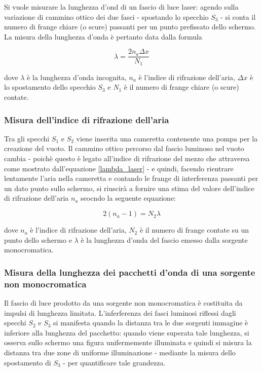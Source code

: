 \documentclass[]{article}
\begin{document}
Si vuole misurare la lunghezza d'ond di un fascio di luce laser: agendo sulla variazione di cammino ottico dei due fasci - spostando lo specchio $S_3$ - si conta il numero di frange chiare (o scure) passanti per un punto prefissato dello schermo. La misura della lunghezza d'onda è pertanto data dalla formula

\begin{equation}
    \label{lambda_laser}
    \lambda = \frac{2 n_a \Delta x}{N_1}
\end{equation}

dove $\lambda$ è la lunghezza d'onda incognita, $n_a$ è l'indice di rifrazione dell'aria, $\Delta x$ è lo spostamento dello specchio $S_3$ e $N_1$ è il numero di frange chiare (o scure) contate.

\subsubsection{Misura dell'indice di rifrazione dell'aria}

Tra gli specchi $S_1$ e $S_2$ viene inserita una cameretta contenente una pompa per la creazione del vuoto. Il cammino ottico percorso dal fascio luminoso nel vuoto cambia - poichè questo è legato all'indice di rifrazione del mezzo che attraversa come mostrato dall'equazione \ref{lambda_laser} - e quindi, facendo rientrare lentamente l'aria nella cameretta e contando le frange di interferenza passanti per un dato punto sullo schermo, si riuscirà a fornire una stima del valore dell'indice di rifrazione dell'aria $n_a$ seocndo la seguente equazione:

\begin{equation}
    \label{n_a}
    2(n_a - 1) = N_2 \lambda
\end{equation}

dove $n_a$ è l'indice di rifrazione dell'aria, $N_2$ è il numero di frange contate su un punto dello schermo e $\lambda$ è la lunghezza d'onda del fascio emesso dalla sorgente monocromatica.

\subsubsection{Misura della lunghezza dei pacchetti d'onda di una sorgente non monocromatica}

Il fascio di luce prodotto da una sorgente non monocromatica è costituita da impulsi di lunghezza limitata. L'inferferenza dei fasci luminosi riflessi dagli specchi $S_2$ e $S_3$ si manifesta quando la distanza tra le due sorgenti immagine è inferiore alla lunghezza del pacchetto: quando viene superata tale lunghezza, si osserva sullo schermo una figura unifermemente illuminata e quindi si misura la distanza tra due zone di uniforme illuminazione - mediante la misura dello spostamento di $S_3$ - per quantificare tale grandezza.
\end{document}
